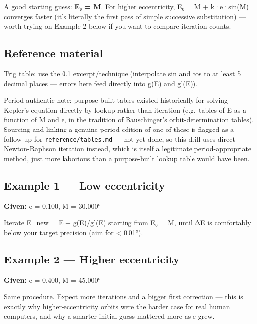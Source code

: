 \documentclass[
  10pt,
]{article}
\begin{document}
A good starting guess: \textbf{E₀ = M}. For higher eccentricity, E₀ = M
+ k·e·sin(M) converges faster (it's literally the first pass of simple
successive substitution) --- worth trying on Example 2 below if you want
to compare iteration counts.

\hypertarget{reference-material}{%
\subsection{Reference material}\label{reference-material}}

Trig table: use the 0.1 excerpt/technique (interpolate sin and cos to at
least 5 decimal places --- errors here feed directly into g(E) and
g'(E)).

Period-authentic note: purpose-built tables existed historically for
solving Kepler's equation directly by lookup rather than iteration
(e.g.~tables of E as a function of M and e, in the tradition of
Bauschinger's orbit-determination tables). Sourcing and linking a
genuine period edition of one of these is flagged as a follow-up for
\texttt{reference/tables.md} --- not yet done, so this drill uses direct
Newton-Raphson iteration instead, which is itself a legitimate
period-appropriate method, just more laborious than a purpose-built
lookup table would have been.

\hypertarget{example-1-low-eccentricity}{%
\subsection{Example 1 --- Low
eccentricity}\label{example-1-low-eccentricity}}

\textbf{Given:} e = 0.100, M = 30.000°

Iterate E\_new = E − g(E)/g'(E) starting from E₀ = M, until
\textbar ΔE\textbar{} is comfortably below your target precision (aim
for \textless{} 0.01°).

\hypertarget{example-2-higher-eccentricity}{%
\subsection{Example 2 --- Higher
eccentricity}\label{example-2-higher-eccentricity}}

\textbf{Given:} e = 0.400, M = 45.000°

Same procedure. Expect more iterations and a bigger first correction ---
this is exactly why higher-eccentricity orbits were the harder case for
real human computers, and why a smarter initial guess mattered more as e
grew.
\end{document}
